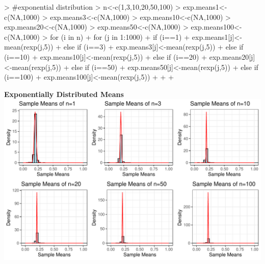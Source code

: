 \documentclass{article}
\begin{document}
\begin{enumerate}
\begin{enumerate}
\begin{Schunk}
\begin{Sinput}
> #exponential distribution
> n<-c(1,3,10,20,50,100)
> exp.means1<-c(NA,1000)
> exp.means3<-c(NA,1000)
> exp.means10<-c(NA,1000)
> exp.means20<-c(NA,1000)
> exp.means50<-c(NA,1000)
> exp.means100<-c(NA,1000)
> for (i in n){
+   for (j in 1:1000){
+     if (i==1){
+     exp.means1[j]<-mean(rexp(j,5))
+     } else if (i==3) {
+       exp.means3[j]<-mean(rexp(j,5))
+     } else if (i==10) {
+       exp.means10[j]<-mean(rexp(j,5))
+     } else if (i==20) {
+       exp.means20[j]<-mean(rexp(j,5))
+     } else if (i==50) {
+       exp.means50[j]<-mean(rexp(j,5))
+     } else if (i==100) {
+       exp.means100[j]<-mean(rexp(j,5))
+     }
+     
+ }}
\end{Sinput}
\end{Schunk}
\newpage
\textbf{Exponentially Distributed Means}
\newline
\includegraphics{HW2-018}


\end{enumerate}
\end{enumerate}
\end{document}
